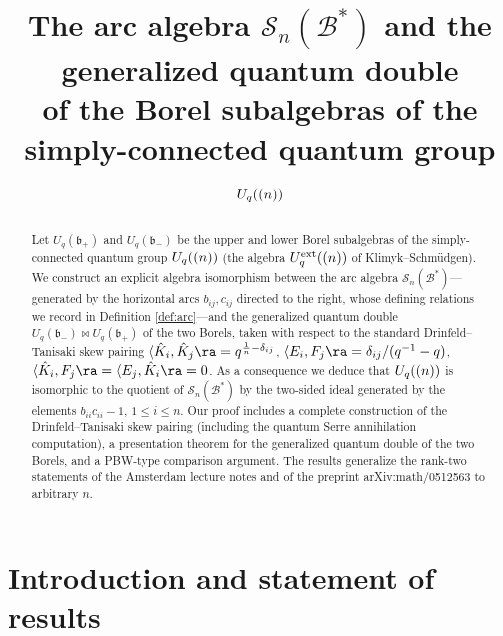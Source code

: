 \documentclass[11pt]{amsart}
\theoremstyle{definition}
\newcommand{\fb}{\mathfrak{b}}
\newcommand{\hK}{\hat K}
\newcommand{\la}{\langle}
\begin{document}
\title{The arc algebra $\mathscr{S}_n(\mathcal{B}^*)$ and the generalized quantum double\\
of the Borel subalgebras of the simply-connected quantum group $U_q(\sl(n))$}

\author{}
\date{}
\maketitle

\begin{abstract}
Let $U_q(\fb_+)$ and $U_q(\fb_-)$ be the upper and lower Borel subalgebras of the
simply-connected quantum group $U_q(\sl(n))$ (the algebra $U_q^{\mathrm{ext}}(\sl(n))$
of Klimyk--Schm\"udgen). We construct an explicit algebra isomorphism between the
arc algebra $\mathscr{S}_n(\mathcal{B}^*)$---generated by the horizontal arcs
$b_{ij},c_{ij}$ directed to the right, whose defining relations we record in
Definition \ref{def:arc}---and the generalized quantum double
$U_q(\fb_-)\bowtie U_q(\fb_+)$ of the two Borels, taken with respect to the standard
Drinfeld--Tanisaki skew pairing
$\la \hK_i,\hK_j\ra=q^{\frac1n-\delta_{ij}}$,
$\la E_i,F_j\ra=\delta_{ij}/(q^{-1}-q)$, $\la \hK_i,F_j\ra=\la E_j,\hK_i\ra=0$.
As a consequence we deduce that $U_q(\sl(n))$ is isomorphic to the quotient of
$\mathscr{S}_n(\mathcal{B}^*)$ by the two-sided ideal generated by the elements
$b_{ii}c_{ii}-1$, $1\le i\le n$. Our proof includes a complete construction of the
Drinfeld--Tanisaki skew pairing (including the quantum Serre annihilation
computation), a presentation theorem for the generalized quantum double of the
two Borels, and a PBW-type comparison argument. The results generalize the
rank-two statements of the Amsterdam lecture notes and of the preprint
arXiv:math/0512563 to arbitrary $n$.
\end{abstract}

\section{Introduction and statement of results}
\end{document}
